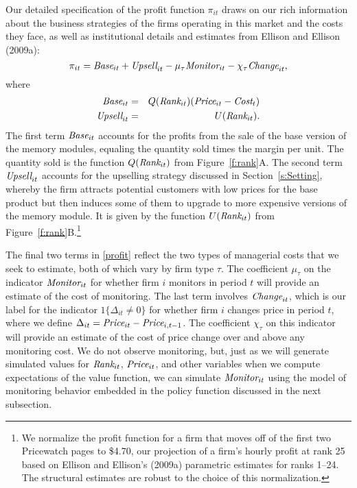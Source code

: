\documentclass[11pt]{article}
\newcommand{\Price}{\mbox{\it Price}}
\newcommand{\Cost}{\mbox{\it Cost}}
\newcommand{\Rank}{\mbox{\it Rank}}
\newcommand{\Base}{\mbox{\it Base}}
\newcommand{\Upsell}{\mbox{\it Upsell}}
\newcommand{\Monitor}{\mbox{\it Monitor}}
\newcommand{\Change}{\mbox{\it Change}}
\begin{document}
\begin{spacing}{1.3}
Our detailed specification of the profit function $\pi_{it}$ draws on
our rich information about the business strategies of the firms
operating in this market and the costs they face, as well as
institutional details and estimates from Ellison and Ellison (2009a):
\begin{equation}
\label{profit}
\pi_{it} = \Base_{it} + \Upsell_{it} - \mu_{\tau} \Monitor_{it} -
\chi_{\tau} \Change_{it},
\end{equation}
where
\begin{eqnarray}
\Base_{it} & = & Q(\Rank_{it}) (\Price_{it} - \Cost_t) \label{base} \\
\Upsell_{it} & = & U(\Rank_{it}). \label{upsell}
\end{eqnarray}
The first term $\Base_{it}$ accounts for the profits from the sale of
the base version of the memory modules, equaling the quantity sold
times the margin per unit. The quantity sold is the function
$Q(\Rank_{it})$ from Figure~\ref{f:rank}A.  The second term
$\Upsell_{it}$ accounts for the upselling strategy discussed in
Section~\ref{s:Setting}, whereby the firm attracts potential customers
with low prices for the base product but then induces some of them to
upgrade to more expensive versions of the memory module. It is given
by the function $U(\Rank_{it})$ from
Figure~\ref{f:rank}B.\footnote{\label{fn:25}We normalize the profit
  function for a firm that moves off of the first two Pricewatch pages
  to \$4.70, our projection of a firm's hourly profit at rank 25 based
  on Ellison and Ellison's (2009a) parametric estimates for ranks
  1--24. The structural estimates are robust to the choice of this
  normalization.}

The final two terms in \eqref{profit} reflect the two types of
managerial costs that we seek to estimate, both of which vary by firm
type $\tau$. The coefficient $\mu_{\tau}$ on the indicator
$\Monitor_{it}$ for whether firm $i$ monitors in period $t$ will
provide an estimate of the cost of monitoring.  The last term involves
$\Change_{it}$, which is our label for the indicator $1\{\Delta_{it}
\neq 0\}$ for whether firm $i$ changes price in period $t$, where we
define $\Delta_{it} = \Price_{it} - \Price_{i,t-1}$. The coefficient
$\chi_{\tau}$ on this indicator will provide an estimate of the cost
of price change over and above any monitoring cost. We do not observe
monitoring, but, just as we will generate simulated values for
$\Rank_{it}$, $\Price_{it}$, and other variables when we compute
expectations of the value function, we can simulate $\Monitor_{it}$
using the model of monitoring behavior embedded in the policy function
discussed in the next subsection.


\end{spacing}
\end{document}
